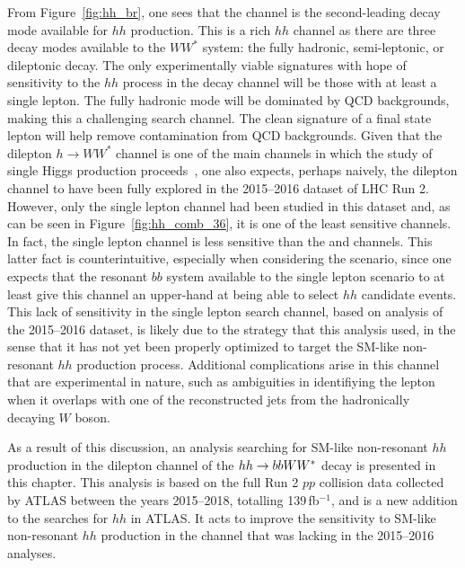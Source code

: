 From Figure~\ref{fig:hh_br}, one sees that the \bbww channel is the second-leading decay mode
available for $hh$ production.
This is a rich $hh$ channel as there are three decay modes available to the $WW^*$ system: the fully hadronic, semi-leptonic, or dileptonic decay.
The only experimentally viable signatures with hope of sensitivity to the $hh$ process in the \bbww decay channel will be those with at least a single lepton.
The fully hadronic mode will be dominated by QCD backgrounds, making this a challenging search channel.
The clean signature of a final state lepton will help remove contamination from QCD backgrounds.
Given that the dilepton $h \rightarrow WW^*$ channel is one of the main channels in which the study
of single Higgs production proceeds~\cite{Aaboud:2018jqu,Aad:2016lvc,ATLAS:2014aga}, one also expects, perhaps naively, the dilepton \bbww 
channel to have been fully explored in the 2015--2016 dataset of LHC Run 2.
However, only the single lepton channel had been studied in this dataset and, as can be seen in Figure~\ref{fig:hh_comb_36},
it is one of the least sensitive channels.
In fact, the single lepton \bbww channel is less sensitive than the \wwww and \wwyy channels.
This latter fact is counterintuitive, especially when considering the \wwww scenario, since
one expects that the resonant $bb$ system available to the single lepton \bbww scenario
to at least give this channel an upper-hand at being able to select $hh$ candidate events.
This lack of sensitivity in the single lepton \bbww search channel, based on analysis of the 2015--2016 dataset, is likely due
to the strategy that this analysis used, in the sense that it has not yet been properly optimized to target
the SM-like non-resonant $hh$ production process.
Additional complications arise in this channel that are experimental in nature, such as ambiguities
in identifiying the lepton when it overlaps with one of the reconstructed jets from the hadronically decaying $W$
boson.

As a result of this discussion, an analysis searching for SM-like non-resonant $hh$ production in the dilepton channel
of the $hh \rightarrow bbWW^*$ decay is presented in this chapter.
This analysis is based on the full Run 2 $pp$ collision data collected by ATLAS between the years
2015--2018, totalling 139\,fb$^{-1}$, and is a new addition to the searches for $hh$ in ATLAS.
It acts to improve the sensitivity to SM-like non-resonant $hh$ production in the \bbww channel that
was lacking in the 2015--2016 analyses.

